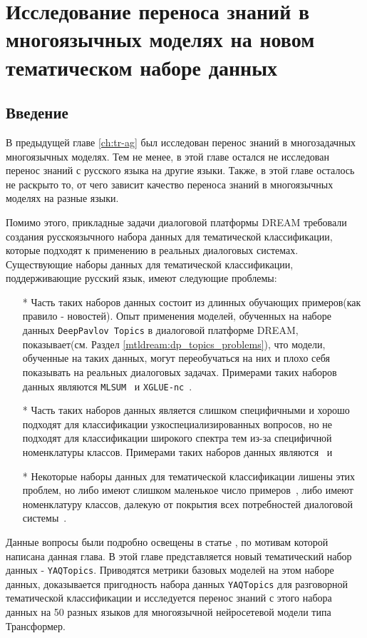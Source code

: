 \chapter{Исследование переноса знаний в многоязычных моделях на новом тематическом наборе данных}
\section{Введение}
В предыдущей главе \ref{ch:tr-ag} был исследован перенос знаний в многозадачных многоязычных моделях. Тем не менее, в этой главе остался не исследован перенос знаний с русского языка на другие языки. Также, в этой главе осталось не раскрыто то, от чего зависит качество переноса знаний в многоязычных моделях на разные языки.

Помимо этого, прикладные задачи диалоговой платформы DREAM требовали создания русскоязычного набора данных для тематической классификации, которые подходят к применению в реальных диалоговых системах. Существующие наборы данных для тематической классификации, поддерживающие русский язык, имеют следующие проблемы:
\begin{itemize}
    \item[*] Часть таких наборов данных состоит из длинных обучающих примеров(как правило - новостей). Опыт применения моделей, обученных на наборе данных \texttt{DeepPavlov Topics} в диалоговой платформе DREAM, показывает(см. Раздел \ref{mtldream:dp_topics_problems}), что модели, обученные на таких данных, могут переобучаться на них и плохо себя показывать на реальных диалоговых задачах. Примерами таких наборов данных являются \texttt{MLSUM}~\cite{mlsum} и \texttt{XGLUE-nc}~\cite{xglue}.
    \item[*] Часть таких наборов данных является слишком специфичными и хорошо подходят для классификации узкоспециализированных вопросов, но не подходят для классификации широкого спектра тем из-за специфичной номенклатуры классов.  Примерами таких наборов данных являются~\cite{healthcare_facilities_reviews} и  ~\cite{pstu}
    \item[*] Некоторые наборы данных для тематической классификации лишены этих проблем, но либо имеют слишком маленькое число примеров~\cite{chatbotru}, либо имеют номенклатуру классов, далекую от покрытия всех потребностей диалоговой системы~\cite{massive}.
\end{itemize}
Данные вопросы были подробно освещены в статье \cite{yaqtopics}, по мотивам которой написана данная глава. В этой главе представляется новый тематический набор данных - \texttt{YAQTopics}. Приводятся метрики базовых моделей на этом наборе данных, доказывается пригодность набора данных \texttt{YAQTopics} для разговорной тематической классификации и исследуется перенос знаний с этого набора данных на 50 разных языков для многоязычной нейросетевой модели типа Трансформер.

